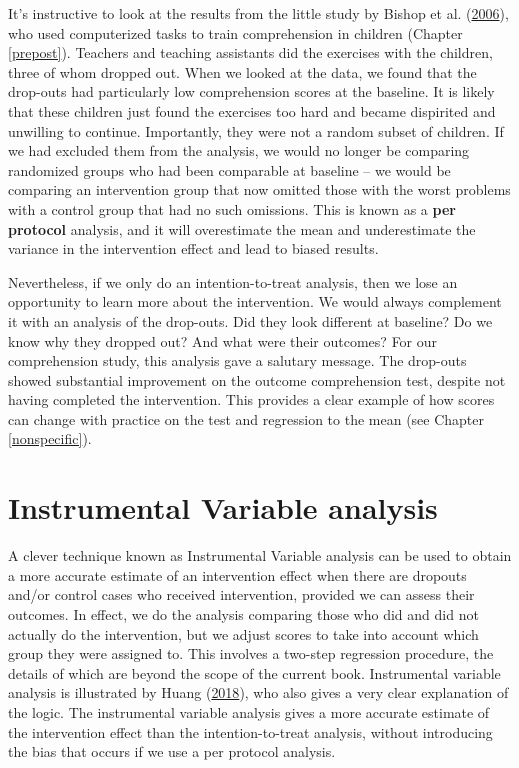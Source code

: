 \documentclass{krantz}
\begin{document}
It's instructive to look at the results from the little study by Bishop et al. (\protect\hyperlink{ref-bishop2006}{2006}), who used computerized tasks to train comprehension in children (Chapter \ref{prepost}). Teachers and teaching assistants did the exercises with the children, three of whom dropped out. When we looked at the data, we found that the drop-outs had particularly low comprehension scores at the baseline. It is likely that these children just found the exercises too hard and became dispirited and unwilling to continue. Importantly, they were not a random subset of children. If we had excluded them from the analysis, we would no longer be comparing randomized groups who had been comparable at baseline -- we would be comparing an intervention group that now omitted those with the worst problems with a control group that had no such omissions. This is known as a \textbf{per protocol} analysis, and it will overestimate the mean and underestimate the variance in the intervention effect and lead to biased results.

Nevertheless, if we only do an intention-to-treat analysis, then we lose an opportunity to learn more about the intervention. We would always complement it with an analysis of the drop-outs. Did they look different at baseline? Do we know why they dropped out? And what were their outcomes? For our comprehension study, this analysis gave a salutary message. The drop-outs showed substantial improvement on the outcome comprehension test, despite not having completed the intervention. This provides a clear example of how scores can change with practice on the test and regression to the mean (see Chapter \ref{nonspecific}).

\hypertarget{instrumental-variable-analysis}{%
\section{Instrumental Variable analysis}\label{instrumental-variable-analysis}}

A clever technique known as Instrumental Variable analysis can be used to obtain a more accurate estimate of an intervention effect when there are dropouts and/or control cases who received intervention, provided we can assess their outcomes. In effect, we do the analysis comparing those who did and did not actually do the intervention, but we adjust scores to take into account which group they were assigned to. This involves a two-step regression procedure, the details of which are beyond the scope of the current book. Instrumental variable analysis is illustrated by Huang (\protect\hyperlink{ref-huang2018}{2018}), who also gives a very clear explanation of the logic. The instrumental variable analysis gives a more accurate estimate of the intervention effect than the intention-to-treat analysis, without introducing the bias that occurs if we use a per protocol analysis.
\end{document}
